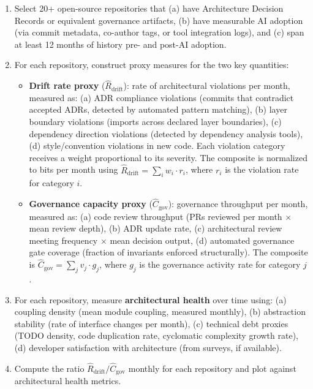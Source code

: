\documentclass[11pt, a4paper]{googledeepmind}
\begin{document}
\begin{enumerate}[nosep]
    \item Select 20+ open-source repositories that (a) have Architecture Decision Records or equivalent governance artifacts, (b) have measurable AI adoption (via commit metadata, co-author tags, or tool integration logs), and (c) span at least 12 months of history pre- and post-AI adoption.
    \item For each repository, construct proxy measures for the two key quantities:
    \begin{itemize}[nosep]
        \item \textbf{Drift rate proxy} ($\hat{R}_{\text{drift}}$): rate of architectural violations per month, measured as: (a) ADR compliance violations (commits that contradict accepted ADRs, detected by automated pattern matching), (b) layer boundary violations (imports across declared layer boundaries), (c) dependency direction violations (detected by dependency analysis tools), (d) style/convention violations in new code. Each violation category receives a weight proportional to its severity. The composite is normalized to bits per month using $\hat{R}_{\text{drift}} = \sum_i w_i \cdot r_i$, where $r_i$ is the violation rate for category $i$.
        \item \textbf{Governance capacity proxy} ($\hat{C}_{\text{gov}}$): governance throughput per month, measured as: (a) code review throughput (PRs reviewed per month $\times$ mean review depth), (b) ADR update rate, (c) architectural review meeting frequency $\times$ mean decision output, (d) automated governance gate coverage (fraction of invariants enforced structurally). The composite is $\hat{C}_{\text{gov}} = \sum_j v_j \cdot g_j$, where $g_j$ is the governance activity rate for category $j$.
    \end{itemize}
    \item For each repository, measure \textbf{architectural health} over time using: (a) coupling density (mean module coupling, measured monthly), (b) abstraction stability (rate of interface changes per month), (c) technical debt proxies (TODO density, code duplication rate, cyclomatic complexity growth rate), (d) developer satisfaction with architecture (from surveys, if available).
    \item Compute the ratio $\hat{R}_{\text{drift}} / \hat{C}_{\text{gov}}$ monthly for each repository and plot against architectural health metrics.
\end{enumerate}
\end{document}
